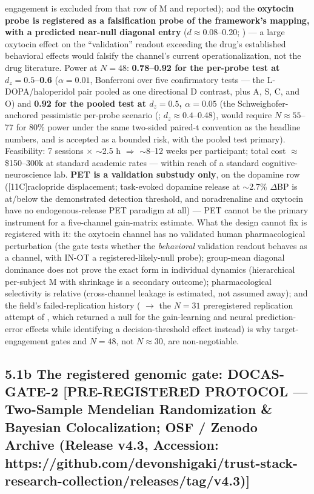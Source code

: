 \documentclass[
]{article}
\begin{document}
engagement is excluded from that row of M and reported); and the
\textbf{oxytocin probe is registered as a falsification probe of the
framework's mapping, with a predicted near-null diagonal entry}
(\(d \approx 0.08\)--0.20; ) --- a large oxytocin effect on the
``validation'' readout exceeding the drug's established behavioral
effects would falsify the channel's current operationalization, not the
drug literature. Power at \(N = 48\): \textbf{0.78--0.92 for the
per-probe test at \(d_z = 0.5\)--0.6} (\(\alpha = 0.01\), Bonferroni
over five confirmatory tests --- the L-DOPA/haloperidol pair pooled as
one directional D contrast, plus A, S, C, and O) and \textbf{0.92 for
the pooled test at \(d_z = 0.5\), \(\alpha = 0.05\)} (the
Schweighofer-anchored pessimistic per-probe scenario (;
\(d_z \approx 0.4\)--0.48), would require \(N \approx 55\)--77 for 80\%
power under the same two-sided paired-t convention as the headline
numbers, and is accepted as a bounded risk, with the pooled test
primary). Feasibility: 7 sessions \(\times\) \(\sim\)2.5 h
\(\Rightarrow\) \(\sim\)8--12 weeks per participant; total cost
\(\approx\) \$150--300k at standard academic rates --- within reach of a
standard cognitive-neuroscience lab. \textbf{PET is a validation
substudy only}, on the dopamine row ({[}11C{]}raclopride displacement;
task-evoked dopamine release at \(\sim\)2.7\% \(\Delta\)BP is at/below
the demonstrated detection threshold, and noradrenaline and oxytocin
have no endogenous-release PET paradigm at all) --- PET cannot be the
primary instrument for a five-channel gain-matrix estimate. What the
design cannot fix is registered with it: the oxytocin channel has no
validated human pharmacological perturbation (the gate tests whether the
\emph{behavioral} validation readout behaves as a channel, with IN-OT a
registered-likely-null probe); group-mean diagonal dominance does not
prove the exact form in individual dynamics (hierarchical per-subject M
with shrinkage is a secondary outcome); pharmacological selectivity is
relative (cross-channel leakage is estimated, not assumed away); and the
field's failed-replication history ( \(\to\) the \(N = 31\)
preregistered replication attempt of , which returned a null for the
gain-learning and neural prediction-error effects while identifying a
decision-threshold effect instead) is why target-engagement gates and
\(N = 48\), not \(N \approx 30\), are non-negotiable.

\subsection{5.1b The registered genomic gate: DOCAS-GATE-2
{[}PRE-REGISTERED PROTOCOL --- Two-Sample Mendelian Randomization \&
Bayesian Colocalization; OSF / Zenodo Archive (Release v4.3, Accession:
https://github.com/devonshigaki/trust-stack-research-collection/releases/tag/v4.3){]}}\label{b-the-registered-genomic-gate-docas-gate-2-pre-registered-protocol-two-sample-mendelian-randomization-bayesian-colocalization-osf-zenodo-archive-release-v4.3-accession-httpsgithub.comdevonshigakitrust-stack-research-collectionreleasestagv4.3}
\end{document}
